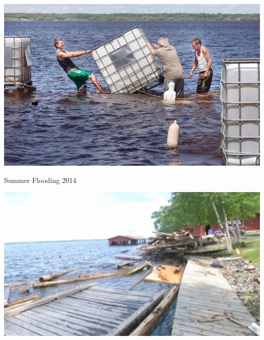 \documentclass[compress,english]{beamer}
\begin{document}
{{\usebackgroundtemplate%
	{\includegraphics[height=\paperheight]{kingFLOOD0617c4.jpg}}

\begin{frame}{Summer Flooding 2014}

\footnotetext{\color{white}{Photo by Bob King (rking@duluthnews.com)}}

\end{frame}
}


{{\usebackgroundtemplate%
	{\includegraphics[height=\paperheight]{resort-damage-2.jpg}}

\begin{frame}{}

\footnotetext{\color{white}{Photo by WCCO, CBS Minnesota}}
  
\end{frame}
}


}}
\end{document}
